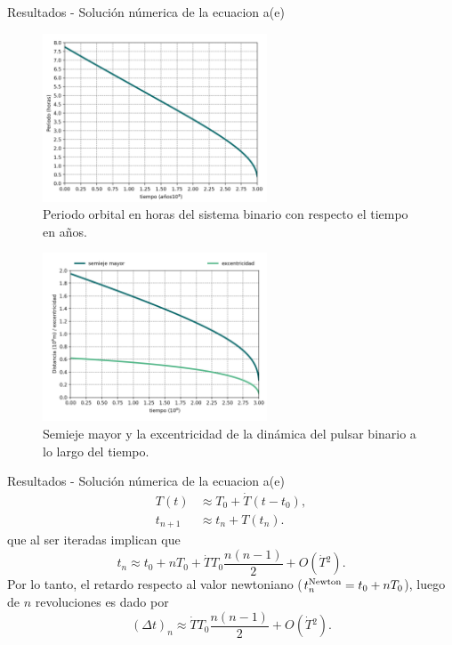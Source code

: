 \begin{frame}{Resultados - Solución númerica de la ecuacion a(e)}
    \begin{minipage}{0.5\linewidth}
        \begin{figure}[H]
            \centering
            \includegraphics[height=5cm]{images/periodo.png}
            \caption{Periodo orbital en horas del sistema binario con respecto el tiempo en años.}
            \label{fig:periodo}
        \end{figure}
    \end{minipage}
    \begin{minipage}{0.45\linewidth}
        \begin{figure}[H]
            \centering
            \includegraphics[height=5cm]{images/a_adim.png}
            \caption{Semieje mayor y la excentricidad de la dinámica del pulsar binario a lo largo del tiempo.}
            \label{fig:semieje,excentricidad}
        \end{figure} 
    \end{minipage}
\end{frame}
\begin{frame}{Resultados - Solución númerica de la ecuacion a(e)}
    \begin{align*}
        T(t)&\approx T_0 + \dot{T}(t-t_0),\\
        t_{n+1}& \approx t_n + T(t_n).
        \end{align*}
        que al ser iteradas implican que
        \begin{equation*}
        t_n \approx t_0+nT_0+\dot{T}T_0\frac{n(n-1)}{2}+O(\dot{T}{}^2).
        \end{equation*}
        Por lo tanto, el retardo respecto al valor newtoniano ($t_n^{\rm Newton}=t_0+nT_0$), luego de $n$ revoluciones es dado por
        \begin{equation*}
        (\Delta t)_n \approx \dot{T}T_0\frac{n(n-1)}{2}+O(\dot{T}{}^2).
        \end{equation*}
\end{frame}
